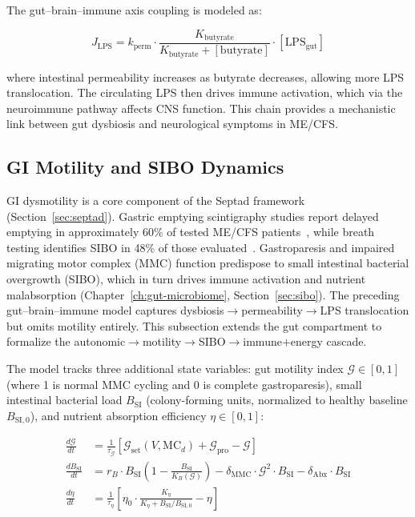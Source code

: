 The gut--brain--immune axis coupling is modeled as:

\begin{equation}
\label{eq:gut-immune}
J_{\text{LPS}} = k_{\text{perm}} \cdot \frac{K_{\text{butyrate}}}{K_{\text{butyrate}} + [\text{butyrate}]} \cdot [\text{LPS}_{\text{gut}}]
\end{equation}

where intestinal permeability increases as butyrate decreases, allowing more LPS translocation. The circulating LPS then drives immune activation, which via the neuroimmune pathway affects CNS function. This chain provides a mechanistic link between gut dysbiosis and neurological symptoms in ME/CFS.

\subsection{GI Motility and SIBO Dynamics}
\label{sec:gi-motility-model}

GI dysmotility is a core component of the Septad framework (Section~\ref{sec:septad}). Gastric emptying scintigraphy studies report delayed emptying in approximately 60\% of tested ME/CFS patients~\cite{GastricDysmotility2023}, while breath testing identifies SIBO in 48\% of those evaluated~\cite{SIBOKarhu2023}. Gastroparesis and impaired migrating motor complex (MMC) function predispose to small intestinal bacterial overgrowth (SIBO), which in turn drives immune activation and nutrient malabsorption (Chapter~\ref{ch:gut-microbiome}, Section~\ref{sec:sibo}). The preceding gut--brain--immune model captures dysbiosis$\to$permeability$\to$LPS translocation but omits motility entirely. This subsection extends the gut compartment to formalize the autonomic$\to$motility$\to$SIBO$\to$immune$+$energy cascade.

The model tracks three additional state variables: gut motility index $\mathcal{G} \in [0,1]$ (where 1 is normal MMC cycling and 0 is complete gastroparesis), small intestinal bacterial load $B_{\text{SI}}$ (colony-forming units, normalized to healthy baseline $B_{\text{SI},0}$), and nutrient absorption efficiency $\eta \in [0,1]$:

\begin{align}
\label{eq:gi-motility}
\frac{d\mathcal{G}}{dt} &= \frac{1}{\tau_{\mathcal{G}}} \left[ \mathcal{G}_{\text{set}}(V, \text{MC}_d) + \mathcal{G}_{\text{pro}} - \mathcal{G} \right] \\[6pt]
\label{eq:sibo-dynamics}
\frac{dB_{\text{SI}}}{dt} &= r_B \cdot B_{\text{SI}} \left(1 - \frac{B_{\text{SI}}}{K_B(\mathcal{G})}\right) - \delta_{\text{MMC}} \cdot \mathcal{G}^2 \cdot B_{\text{SI}} - \delta_{\text{Abx}} \cdot B_{\text{SI}} \\[6pt]
\label{eq:absorption-efficiency}
\frac{d\eta}{dt} &= \frac{1}{\tau_\eta} \left[ \eta_0 \cdot \frac{K_\eta}{K_\eta + B_{\text{SI}}/B_{\text{SI},0}} - \eta \right]
\end{align}

